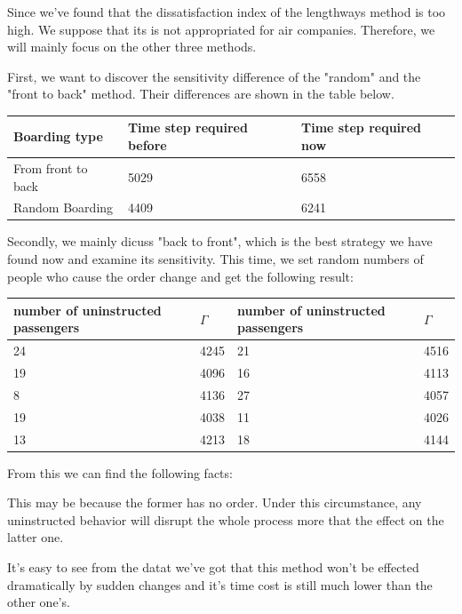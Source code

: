 \documentclass{article}
\begin{document}
	Since we've found that the dissatisfaction index of the lengthways method is too high. We  suppose that its is not appropriated for air companies. Therefore, we will mainly focus on the other three methods.

	First, we want to discover the sensitivity difference of the "random" and the "front to back" method. Their differences are shown in the table below.

	\begin{center}
	\begin{tabular}{||l|l|l||}
		\hline
		Boarding type&Time step required before&Time step required now\\
		\hline
		From front to back&5029&6558\\
		Random Boarding&4409&6241\\
		\hline
	\end{tabular}
	\end{center}

	Secondly, we mainly dicuss "back to front", which is the  best strategy we have found now and examine its sensitivity. This time, we set random numbers of people who cause the order change and get the following result:
	\begin{center}
	\begin{tabular}{||l|l|l|l||}
		\hline
		number of uninstructed passengers&\(\Gamma\)&number of uninstructed passengers&\(\Gamma\)\\
		\hline
		24&4245&21&4516\\
		19&4096&16&4113\\
		8&4136&27&4057\\
		19&4038&11&4026\\
		13&4213&18&4144\\
		\hline
	\end{tabular}
	\end{center}

	From this we can find the following facts:
	\begin{enumerate}

		This may be because the former has no order. Under this circumstance, any uninstructed behavior will disrupt the whole process more that the effect on the latter one.

		It's easy to see from the datat we've got that this method won't be effected dramatically by sudden changes and  it's time cost is still much lower  than the other one's.
	\end{enumerate}
\end{document}
